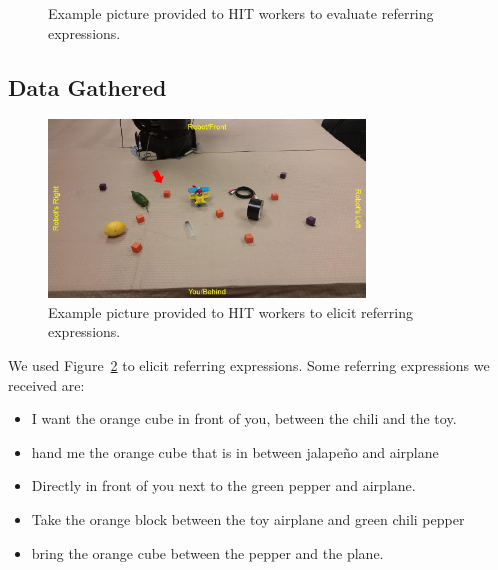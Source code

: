 \documentclass[letterpaper,10pt]{article}
\begin{document}
\begin{figure}[h!tb]
  \centering
  \caption{Example picture provided to HIT workers to evaluate referring expressions.}
  \label{fig:ref_expr_eval_pic}
\end{figure}

\subsection{Data Gathered}

\begin{figure}[h!tb]
  \centering
    \includegraphics[width=0.75\textwidth]{ref_expr_examples_pic}
  \caption{Example picture provided to HIT workers to elicit referring expressions.}
  \label{fig:ref_expr_examples_pic}
\end{figure}

We used Figure~\ref{fig:ref_expr_examples_pic} to elicit referring expressions. Some referring expressions we received are:

\begin{itemize}[topsep=0pt,itemsep=-1ex,partopsep=1ex,parsep=1ex]
	\item I want the orange cube in front of you, between the chili and the toy.
	\item hand me the orange cube that is in between jalape\~{n}o and airplane
	\item Directly in front of you next to the green pepper and airplane.
	\item Take the orange block between the toy airplane and green chili pepper
	\item bring the orange cube between the pepper and the plane.
\end{itemize}
\end{document}

